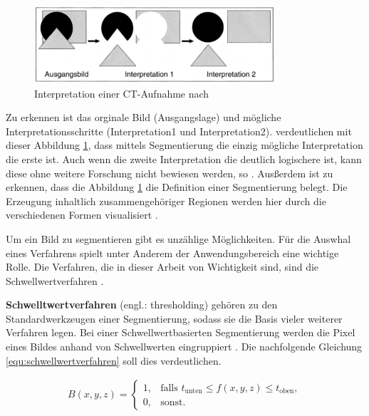 \begin{figure}[h]
	\centering
	\includegraphics[width=0.8\textwidth]{img/bild_interpretation.jpg}
	\caption{Interpretation einer CT-Aufnahme nach \citet[Seite 360]{lehmann2013bildverarbeitung}}
	\label{fig:interpretation_einer_ct_aufnahem}
\end{figure}

Zu erkennen ist das orginale Bild (Ausgangslage) und mögliche
Interpretationsschritte (Interpretation1 und Interpretation2). \citet[Seite 360]{lehmann2013bildverarbeitung}
verdeutlichen mit dieser Abbildung \ref{fig:interpretation_einer_ct_aufnahem},
dass mittels Segmentierung die einzig mögliche Interpretation die erste ist. Auch
wenn die zweite Interpretation die deutlich logischere ist, kann diese ohne
weitere Forschung nicht bewiesen werden, so \citet[Seite 360]{lehmann2013bildverarbeitung}.
Ausßerdem ist zu erkennen, dass die Abbildung \ref{fig:interpretation_einer_ct_aufnahem}
die Definition einer Segmentierung belegt. Die Erzeugung inhaltlich
zusammengehöriger Regionen werden hier durch die verschiedenen Formen
visualisiert \citep[vgl.][Seite 360]{lehmann2013bildverarbeitung}.

Um ein Bild zu segmentieren gibt es unzählige Möglichkeiten. Für die Auswhal eines
Verfahrens spielt unter Anderem der Anwendungsbereich eine wichtige Rolle. Die
Verfahren, die in dieser Arbeit von Wichtigkeit sind, sind die
Schwellwertverfahren \citep[vgl.][Seite 361]{lehmann2013bildverarbeitung}.

\pagebreak

\textbf{Schwelltwertverfahren} (engl.: thresholding) gehören zu den
Standardwerkzeugen einer Segmentierung, sodass sie die Basis vieler weiterer Verfahren
legen. Bei einer Schwellwertbasierten Segmentierung werden die Pixel eines
Bildes anhand von Schwellwerten eingruppiert \citep[vgl.][Seite 96]{handels2000}.
Die nachfolgende Gleichung \ref{equ:schwellwertverfahren} soll dies verdeutlichen.

\begin{align}
	\label{equ:schwellwertverfahren}B(x, y, z) = \begin{cases}1,&\text{falls }t_{\text{unten}}\leq f(x, y, z) \leq t_{\text{oben}}, \\ 0,&\text{sonst}.\end{cases}
\end{align}

